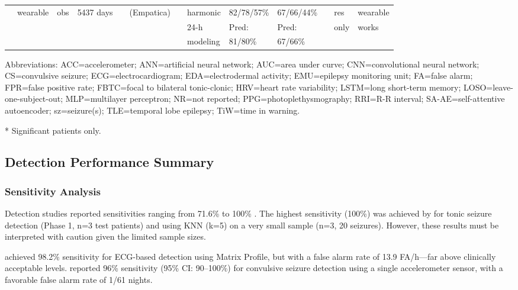 \begin{table}[htbp]
\begin{tabular}{p{2.8cm}p{1.8cm}p{1.6cm}p{1.4cm}p{1.5cm}p{1.6cm}p{1.4cm}p{1.2cm}p{1.4cm}p{1.4cm}p{1.2cm}p{1.6cm}p{2.2cm}}
& wearable & obs & 5437 days & & (Empatica) & & harmonic & 82/78/57\% & 67/66/44\% & & res & wearable \\
& & & & & & & 24-h & Pred: & Pred: & & only & works \\[4pt]
& & & & & & & modeling & 81/80\% & 67/66\% & & & \\
\bottomrule
\end{tabular}
\begin{tablenotes}
\small
\item[] Abbreviations: ACC=accelerometer; ANN=artificial neural network; AUC=area under curve; CNN=convolutional neural network; CS=convulsive seizure; ECG=electrocardiogram; EDA=electrodermal activity; EMU=epilepsy monitoring unit; FA=false alarm; FPR=false positive rate; FBTC=focal to bilateral tonic-clonic; HRV=heart rate variability; LSTM=long short-term memory; LOSO=leave-one-subject-out; MLP=multilayer perceptron; NR=not reported; PPG=photoplethysmography; RRI=R-R interval; SA-AE=self-attentive autoencoder; sz=seizure(s); TLE=temporal lobe epilepsy; TiW=time in warning.
\item[] * Significant patients only.
\end{tablenotes}
\end{table}

\subsection{Detection Performance Summary}

\subsubsection{Sensitivity Analysis}
Detection studies reported sensitivities ranging from 71.6\% \parencite{dong2026} to 100\% \parencite{fine2025, borujeny2013}. The highest sensitivity (100\%) was achieved by \textcite{fine2025} for tonic seizure detection (Phase 1, n=3 test patients) and \textcite{borujeny2013} using KNN (k=5) on a very small sample (n=3, 20 seizures). However, these results must be interpreted with caution given the limited sample sizes.

\textcite{reintjes2025} achieved 98.2\% sensitivity for ECG-based detection using Matrix Profile, but with a false alarm rate of 13.9 FA/h—far above clinically acceptable levels. \textcite{spahr2025} reported 96\% sensitivity (95\% CI: 90--100\%) for convulsive seizure detection using a single accelerometer sensor, with a favorable false alarm rate of 1/61 nights.

